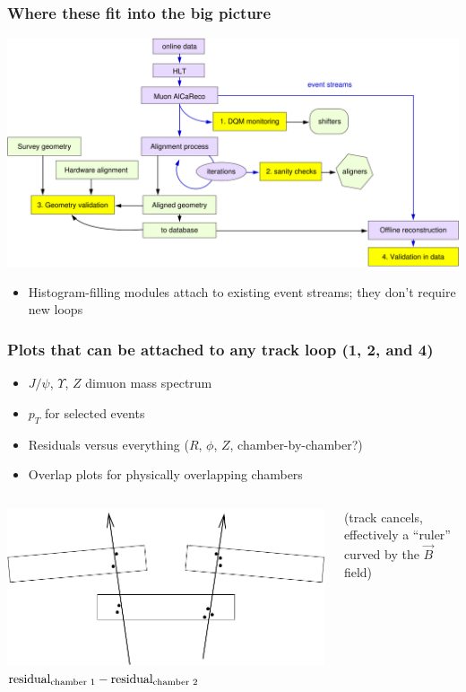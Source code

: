 \documentclass[compress]{beamer}
\begin{document}
\begin{frame}
\frametitle{Where these fit into the big picture}
\includegraphics[width=\linewidth]{loops}
\begin{itemize}
\item Histogram-filling modules attach to existing event streams; they don't require new loops
\end{itemize}
\end{frame}

\begin{frame}
\frametitle{Plots that can be attached to any track loop (1, 2, and 4)}
\begin{minipage}{1.1\linewidth}
\begin{itemize}\setlength{\itemsep}{0.75 cm}
\item $J/\psi$, $\Upsilon$, $Z$ dimuon mass spectrum
\item $p_T$ for selected events
\item Residuals versus everything ($R$, $\phi$, $Z$, chamber-by-chamber?)
\item Overlap plots for physically overlapping chambers
\end{itemize}
\end{minipage}
\begin{columns}
\includegraphics[width=\linewidth]{overlap_plots}
$\mbox{residual}_{\mbox{\scriptsize chamber 1}} - \mbox{residual}_{\mbox{\scriptsize chamber 2}}$

\vspace{0.5 cm}
(track cancels, effectively a ``ruler'' curved by the $\vec{B}$ field)
\end{columns}
\end{frame}
\end{document}
